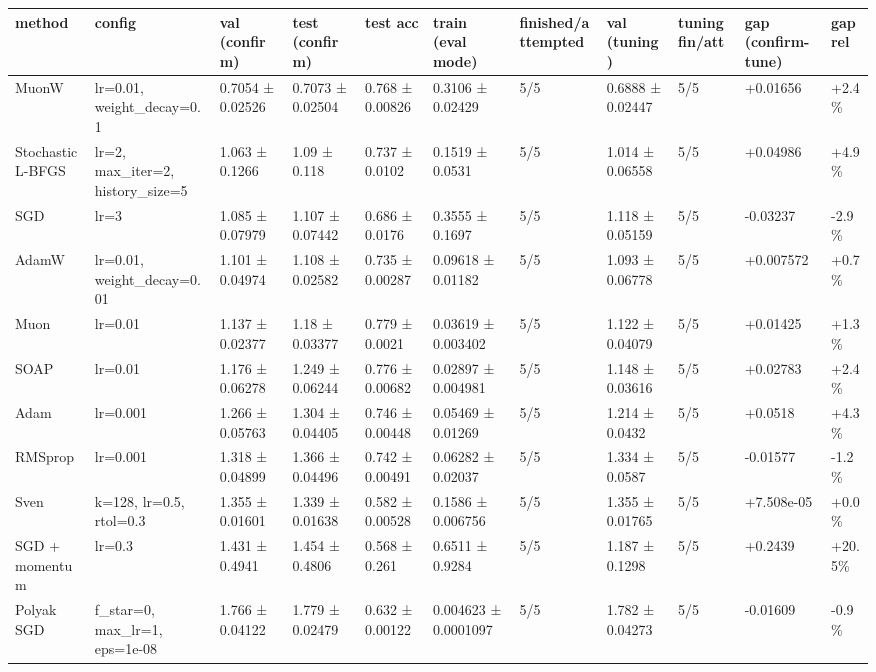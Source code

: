 \begin{tabular}{lllllllllll}
\toprule
method & config & val (confirm) & test (confirm) & test acc & train (eval mode) & finished/attempted & val (tuning) & tuning fin/att & gap (confirm-tune) & gap rel \\
\midrule
MuonW & lr=0.01, weight\_decay=0.1 & 0.7054 ± 0.02526 & 0.7073 ± 0.02504 & 0.768 ± 0.00826 & 0.3106 ± 0.02429 & 5/5 & 0.6888 ± 0.02447 & 5/5 & +0.01656 & +2.4\% \\
Stochastic L-BFGS & lr=2, max\_iter=2, history\_size=5 & 1.063 ± 0.1266 & 1.09 ± 0.118 & 0.737 ± 0.0102 & 0.1519 ± 0.0531 & 5/5 & 1.014 ± 0.06558 & 5/5 & +0.04986 & +4.9\% \\
SGD & lr=3 & 1.085 ± 0.07979 & 1.107 ± 0.07442 & 0.686 ± 0.0176 & 0.3555 ± 0.1697 & 5/5 & 1.118 ± 0.05159 & 5/5 & -0.03237 & -2.9\% \\
AdamW & lr=0.01, weight\_decay=0.01 & 1.101 ± 0.04974 & 1.108 ± 0.02582 & 0.735 ± 0.00287 & 0.09618 ± 0.01182 & 5/5 & 1.093 ± 0.06778 & 5/5 & +0.007572 & +0.7\% \\
Muon & lr=0.01 & 1.137 ± 0.02377 & 1.18 ± 0.03377 & 0.779 ± 0.0021 & 0.03619 ± 0.003402 & 5/5 & 1.122 ± 0.04079 & 5/5 & +0.01425 & +1.3\% \\
SOAP & lr=0.01 & 1.176 ± 0.06278 & 1.249 ± 0.06244 & 0.776 ± 0.00682 & 0.02897 ± 0.004981 & 5/5 & 1.148 ± 0.03616 & 5/5 & +0.02783 & +2.4\% \\
Adam & lr=0.001 & 1.266 ± 0.05763 & 1.304 ± 0.04405 & 0.746 ± 0.00448 & 0.05469 ± 0.01269 & 5/5 & 1.214 ± 0.0432 & 5/5 & +0.0518 & +4.3\% \\
RMSprop & lr=0.001 & 1.318 ± 0.04899 & 1.366 ± 0.04496 & 0.742 ± 0.00491 & 0.06282 ± 0.02037 & 5/5 & 1.334 ± 0.0587 & 5/5 & -0.01577 & -1.2\% \\
Sven & k=128, lr=0.5, rtol=0.3 & 1.355 ± 0.01601 & 1.339 ± 0.01638 & 0.582 ± 0.00528 & 0.1586 ± 0.006756 & 5/5 & 1.355 ± 0.01765 & 5/5 & +7.508e-05 & +0.0\% \\
SGD + momentum & lr=0.3 & 1.431 ± 0.4941 & 1.454 ± 0.4806 & 0.568 ± 0.261 & 0.6511 ± 0.9284 & 5/5 & 1.187 ± 0.1298 & 5/5 & +0.2439 & +20.5\% \\
Polyak SGD & f\_star=0, max\_lr=1, eps=1e-08 & 1.766 ± 0.04122 & 1.779 ± 0.02479 & 0.632 ± 0.00122 & 0.004623 ± 0.0001097 & 5/5 & 1.782 ± 0.04273 & 5/5 & -0.01609 & -0.9\% \\
\bottomrule
\end{tabular}
